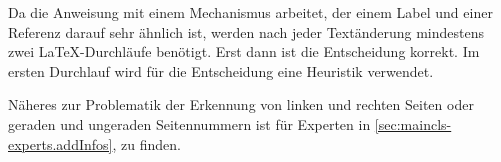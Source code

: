 Da die Anweisung  mit einem Mechanismus arbeitet, der
einem Label und einer Referenz darauf sehr ähnlich ist, werden nach jeder
Textänderung mindestens zwei \LaTeX-Durchläufe benötigt. Erst dann ist die
Entscheidung korrekt. Im ersten Durchlauf wird für die
Entscheidung eine Heuristik verwendet.

Näheres zur Problematik der Erkennung von linken und rechten Seiten oder
geraden und ungeraden Seitennummern ist für Experten in
\autoref{sec:maincls-experts.addInfos},
 zu finden.%
%
\EndIndexGroup
%
\EndIndexGroup


